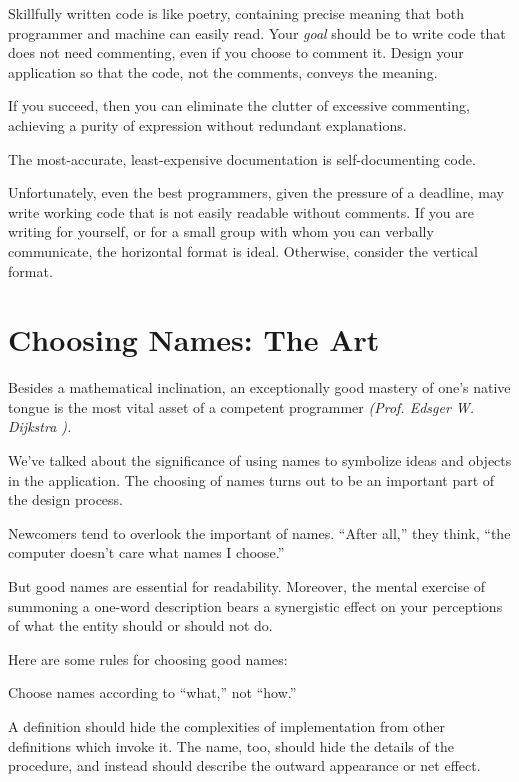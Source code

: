 Skillfully written \Forth{} code is like poetry, containing precise
meaning that both programmer and machine can easily read.  Your
\emph{goal} should be to write code that does not need commenting,
even if you choose to comment it.  Design your application so that the
code, not the comments, conveys the meaning.

If you succeed, then you can eliminate the clutter of excessive
commenting, achieving a purity of expression without redundant
explanations.


\begin{tip}
The most-accurate, least-expensive documentation
is self-documenting code.
\end{tip}
Unfortunately, even the best programmers, given the pressure of a
deadline, may write working code that is not easily readable without
comments.  If you are writing for yourself, or for a small group with
whom you can verbally communicate, the horizontal format is ideal.
Otherwise, consider the vertical format.

\section{Choosing Names: The Art}

\begin{tfquot}
Besides a mathematical inclination, an exceptionally good mastery of
one's native tongue is the most vital asset of a competent programmer
\emph{(Prof.  Edsger W. Dijkstra \cite{dijkstra82}).}
\end{tfquot}
We've talked about the significance of using names to symbolize ideas
and objects in the application.  The choosing of names turns out to be
an important part of the design process.

Newcomers tend to overlook the important of names.  ``After all,''
they think, ``the computer doesn't care what names I choose.''

But good names are essential for readability.  Moreover, the mental
exercise of summoning a one-word description bears a synergistic effect
on your perceptions of what the entity should or should not do.

\smallbreak
Here are some rules for choosing good names:
\begin{tip}
Choose names according to ``what,'' not ``how.''
\end{tip}
A definition should hide the complexities of implementation from other
definitions which invoke it.  The name, too, should hide the details
of the procedure, and instead should describe the outward appearance
or net effect.

